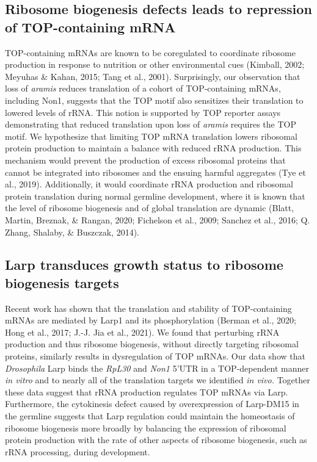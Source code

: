 \documentclass[12pt,oneside]{reedthesis}
\begin{document}
\hypertarget{ribosome-biogenesis-defects-leads-to-repression-of-top-containing-mrna}{%
\subsection{Ribosome biogenesis defects leads to repression of TOP-containing mRNA}\label{ribosome-biogenesis-defects-leads-to-repression-of-top-containing-mrna}}

TOP-containing mRNAs are known to be coregulated to coordinate ribosome
production in response to nutrition or other environmental cues
(Kimball, 2002; Meyuhas \& Kahan, 2015; Tang et al., 2001). Surprisingly, our observation
that loss of \emph{aramis} reduces translation of a cohort of TOP-containing
mRNAs, including Non1, suggests that the TOP motif also sensitizes their
translation to lowered levels of rRNA. This notion is supported by TOP
reporter assays demonstrating that reduced translation upon loss of
\emph{aramis} requires the TOP motif. We hypothesize that limiting TOP mRNA
translation lowers ribosomal protein production to maintain a balance
with reduced rRNA production. This mechanism would prevent the
production of excess ribosomal proteins that cannot be integrated into
ribosomes and the ensuing harmful aggregates
(Tye et al., 2019). Additionally, it would
coordinate rRNA production and ribosomal protein translation during
normal germline development, where it is known that the level of
ribosome biogenesis and of global translation are dynamic
(Blatt, Martin, Breznak, \& Rangan, 2020; Fichelson et al., 2009; Sanchez et al., 2016; Q. Zhang, Shalaby, \& Buszczak, 2014).

\hypertarget{larp-transduces-growth-status-to-ribosome-biogenesis-targets}{%
\subsection{Larp transduces growth status to ribosome biogenesis targets}\label{larp-transduces-growth-status-to-ribosome-biogenesis-targets}}

Recent work has shown that the translation and stability of
TOP-containing mRNAs are mediated by Larp1 and its phosphorylation
(Berman et al., 2020; Hong et al., 2017; J.-J. Jia et al., 2021). We found that perturbing rRNA production
and thus ribosome biogenesis, without directly targeting ribosomal
proteins, similarly results in dysregulation of TOP mRNAs. Our data show
that \emph{Drosophila} Larp binds the \emph{RpL30} and \emph{Non1} 5'UTR in a
TOP-dependent manner \emph{in vitro} and to nearly all of the translation
targets we identified \emph{in vivo.} Together these data suggest that rRNA
production regulates TOP mRNAs via Larp. Furthermore, the cytokinesis
defect caused by overexpression of Larp-DM15 in the germline suggests
that Larp regulation could maintain the homeostasis of ribosome
biogenesis more broadly by balancing the expression of ribosomal protein
production with the rate of other aspects of ribosome biogenesis, such
as rRNA processing, during development.
\end{document}
